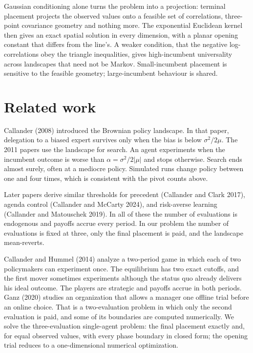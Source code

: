 \documentclass[11pt]{article}
\theoremstyle{itheads}
\begin{document}
Gaussian conditioning alone turns the problem into a projection:
terminal placement projects the observed values onto a feasible set of
correlations, three-point covariance geometry and nothing more. The
exponential Euclidean kernel then gives an exact spatial solution in
every dimension, with a planar opening constant that differs from the
line's. A weaker condition, that the negative log-correlations obey the
triangle inequalities, gives high-incumbent universality across
landscapes that need not be Markov. Small-incumbent placement is
sensitive to the feasible geometry; large-incumbent behaviour is
shared.

\section{Related work}

Callander (2008) introduced the Brownian policy landscape. In that
paper, delegation to a biased expert survives only when the bias is
below $\sigma^{2}/2\mu$. The 2011 papers use the landscape for
search. An agent experiments when the incumbent outcome is worse
than $\alpha=\sigma^{2}/2|\mu|$ and stops otherwise. Search ends
almost surely, often at a mediocre policy. Simulated runs change
policy between one and four times, which is consistent with the
pivot counts above.

Later papers derive similar thresholds for
precedent (Callander and Clark 2017), agenda control (Callander and
McCarty 2024), and risk-averse learning (Callander and Matouschek
2019). In all of these the number of evaluations is endogenous and
payoffs accrue every period. In our problem the number of
evaluations is fixed at three, only the final placement is paid, and
the landscape mean-reverts.

Callander and Hummel (2014) analyze a two-period game in which each
of two policymakers can experiment once. The equilibrium has two
exact cutoffs, and the first mover sometimes experiments although
the status quo already delivers his ideal outcome. The players are
strategic and payoffs accrue in both periods. Ganz (2020) studies an
organization that allows a manager one offline trial before an
online choice. That is a two-evaluation problem in which only the
second evaluation is paid, and some of its boundaries are computed
numerically. We solve the three-evaluation single-agent problem: the final
placement exactly and, for equal observed values, with every phase
boundary in closed form; the opening trial reduces to a
one-dimensional numerical optimization.
\end{document}
